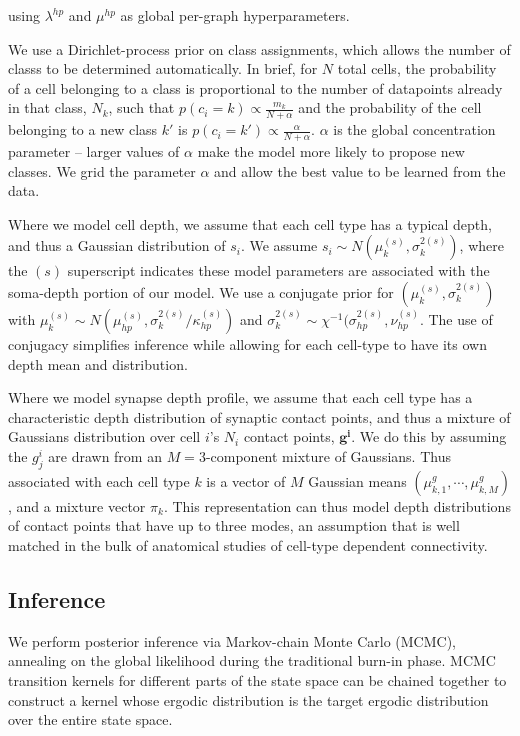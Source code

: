 \documentclass{article}
\renewcommand{\vec}[1]{\mathbf{#1}}
\begin{document}
{using  $\lambda^{hp}$ and $\mu^{hp}$ as global per-graph hyperparameters. 

We use a Dirichlet-process prior on class assignments, which allows
the number of classs to be determined automatically. In brief, for $N$
total cells, the probability of a cell belonging to a class is
proportional to the number of datapoints already in that class, $N_k$,
such that $p(c_i = k) \propto \frac{m_k}{N + \alpha}$ and the
probability of the cell belonging to a new class $k'$ is $p(c_i = k')
\propto \frac{\alpha}{N + \alpha}$. $\alpha$ is the global
concentration parameter -- larger values of $\alpha$ make the model
more likely to propose new classes. We grid the parameter $\alpha$ and
allow the best value to be learned from the data.


Where we model cell depth, we assume that 
each cell type has a typical depth, and thus a Gaussian distribution
of $s_i$. We assume $s_i \sim N(\mu^{(s)}_k,
\sigma^{2(s)}_k)$, where the $(s)$ superscript indicates
these model parameters are associated with the soma-depth 
portion of our model.  We use a conjugate prior for $(\mu^{(s)}_k, \sigma^{2(s)}_k)$ with
$\mu^{(s)}_k \sim N(\mu^{(s)}_{hp}, \sigma^{2(s)}_k/ \kappa^{(s)}_{hp})$ and $\sigma^{2(s)}_k \sim
\chi^{-1}(\sigma^{2(s)}_{hp}, \nu^{(s)}_{hp}$. The use of conjugacy simplifies inference while allowing for each cell-type to have its own depth mean and distribution. 

Where we model synapse depth profile, we assume that each cell
type has a characteristic depth distribution of synaptic contact points, and thus
a mixture of Gaussians distribution over cell $i$’s $N_i$ contact points, $\vec{g^i}$.
We do this by assuming the $g^i_j$
are drawn from an $M=3$-component mixture of Gaussians. Thus associated with each cell type $k$ is a vector
of $M$ Gaussian means $(\mu^g_{k,1}, \cdots, \mu^g_{k, M})$, and a
mixture vector $\pi_k$.  This representation can thus model depth distributions of contact points that have up to three modes, an assumption that is well matched in the bulk of anatomical studies of cell-type dependent connectivity.


\subsection*{Inference} 
We perform posterior inference via Markov-chain Monte Carlo (MCMC),
annealing on the global likelihood during the traditional burn-in
phase. MCMC transition kernels for different parts of the state space
can be chained together to construct a kernel whose ergodic
distribution is the target ergodic distribution over the entire state space. 

}
\end{document}
